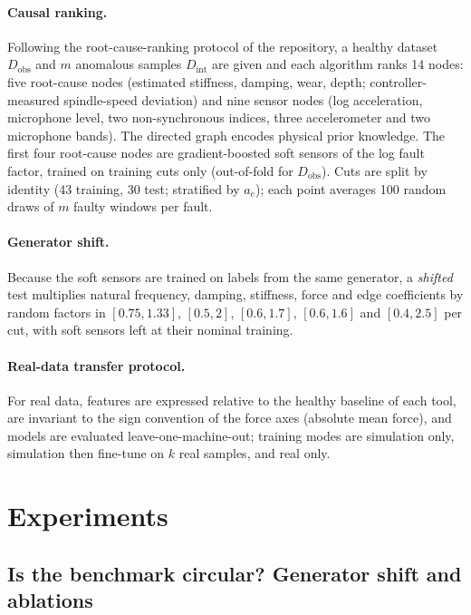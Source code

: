 \documentclass[11pt]{article}
\begin{document}
\paragraph{Causal ranking.} Following the root-cause-ranking protocol of the repository, a healthy dataset $D_\text{obs}$ and $m$ anomalous samples $D_\text{int}$ are given and each algorithm ranks 14 nodes: five root-cause nodes (estimated stiffness, damping, wear, depth; controller-measured spindle-speed deviation) and nine sensor nodes (log acceleration, microphone level, two non-synchronous indices, three accelerometer and two microphone bands). The directed graph encodes physical prior knowledge. The first four root-cause nodes are gradient-boosted soft sensors of the log fault factor, trained on training cuts only (out-of-fold for $D_\text{obs}$). Cuts are split by identity (43 training, 30 test; stratified by $a_e$); each point averages 100 random draws of $m$ faulty windows per fault.
\paragraph{Generator shift.} Because the soft sensors are trained on labels from the same generator, a \emph{shifted} test multiplies natural frequency, damping, stiffness, force and edge coefficients by random factors in $[0.75,1.33]$, $[0.5,2]$, $[0.6,1.7]$, $[0.6,1.6]$ and $[0.4,2.5]$ per cut, with soft sensors left at their nominal training.
\paragraph{Real-data transfer protocol.} For real data, features are expressed relative to the healthy baseline of each tool, are invariant to the sign convention of the force axes (absolute mean force), and models are evaluated leave-one-machine-out; training modes are simulation only, simulation then fine-tune on $k$ real samples, and real only.

\section{Experiments}
\subsection{Is the benchmark circular? Generator shift and ablations}\label{sec:circ}
\end{document}
